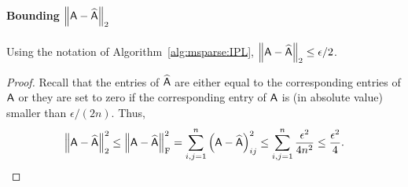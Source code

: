 \paragraph{Bounding $\left\|{\mathsf{A} } - \widehat{{\mathsf{A} }}\right\|_2$}
%
\begin{lemma}\label{lem:lem1}
Using the notation of Algorithm~\ref{alg:msparse:IPL}, $\left\|{\mathsf{A} } - \widehat{{\mathsf{A} }}\right\|_2 \leq \epsilon/2$.
\end{lemma}
\begin{proof}
%
Recall that the entries of $\widehat{{\mathsf{A} }}$ are either equal to the corresponding entries of ${\mathsf{A} }$ or they are set to zero if the corresponding entry of ${\mathsf{A} }$ is (in absolute value) smaller than $\epsilon/(2n)$. Thus,
%
\[\left\|{\mathsf{A} }-\widehat{{\mathsf{A} }}\right\|_2^2 \leq \left\|{\mathsf{A} }-\widehat{{\mathsf{A} }}\right\|_{\textrm{F}}^2 = \sum_{i,j=1}^n \left({\mathsf{A} } - \widehat{{\mathsf{A} }}\right)_{ij}^2 \leq \sum_{i,j=1}^n \frac{\epsilon^2}{4n^2}\leq \frac{\epsilon^2}{4}.\]
%
\end{proof}
